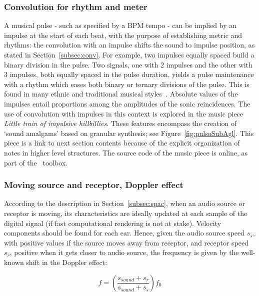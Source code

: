\subsubsection{Convolution for rhythm and meter}
A musical pulse - such as specified by a BPM
tempo - can be implied by an impulse at the start of each beat, with the purpose of establishing metric and rhythms: the convolution with an impulse shifts the sound to impulse position, as stated in Section~\ref{subsec:conv}. For example, two impulses equally spaced build a binary division in the
pulse. Two signals, one with 2 impulses and the other with 3 impulses, both equally spaced in the pulse duration, yields a pulse
maintenance with a rhythm which eases both binary or ternary
divisions of the pulse. This is found in many ethnic and traditional musical styles~\cite{Gramani}. Absolute values of the impulses entail
proportions among the amplitudes of the sonic reincidences. The use of convolution with impulses in this context is explored in the music piece \emph{Little train of impulsive hillbillies}.
These features encompass
the creation of `sound amalgams' based on granular synthesis; see Figure~\ref{fig:pulsoSubAgl}. This piece is a link to next section contents because of the explicit organization of notes in higher level structures. The source code of the music piece is online, as part of the \massa\ toolbox\cite{MASSA}.


\subsubsection{Moving source and receptor, Doppler effect}
According to the description in Section~\ref{subsec:spac}, when an audio source or receptor is moving, its characteristics are ideally updated at each sample of the digital signal (if fast computational rendering is not at stake). Velocity components should be found for each ear. Hence, given the audio source speed $s_s$, with positive values if the source moves away from receptor, and receptor speed $s_r$, positive when it gets closer to audio source, the frequency is given by the well-known shift in the Doppler effect:

\begin{equation}\label{eq:fDoppler}
    f=\left(\frac{s_{sound}+s_r}{s_{sound}+s_s}\right)f_0
\end{equation}

